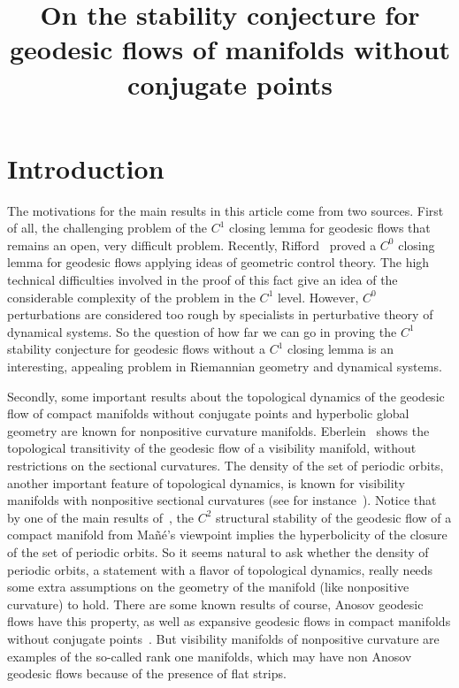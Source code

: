 \documentclass[AHL,Unicode,longabstracts,published]{cedram}
\title[On the stability conjecture for geodesic flows]{On the stability conjecture for geodesic flows of manifolds without conjugate points}
\author[\initial{L.} \lastname{Rifford}]{\firstname{Ludovic} \lastname{Rifford}}
\author[\initial{R.} \lastname{Ruggiero}]{\firstname{Rafael} \lastname{Ruggiero}}
\begin{document}
\maketitle

\section{Introduction}

The motivations for the main results in this article come from two sources. First of all, the challenging problem of the $C^{1}$ closing lemma for geodesic flows that remains an open, very difficult problem. Recently, Rifford~\cite{kn:Rifford} proved a $C^{0}$ closing lemma for geodesic flows applying ideas of geometric control theory. The high technical difficulties involved in the proof of this fact give an idea of the considerable complexity of the problem in the $C^{1}$ level. However, $C^{0}$ perturbations are considered too rough by specialists in perturbative theory of dynamical systems. So the question of how far we can go in proving the $C^{1}$ stability conjecture for geodesic flows without a $C^{1}$ closing lemma is an interesting, appealing problem in Riemannian geometry and dynamical systems.

Secondly, some important results about the topological dynamics of the geodesic flow of compact manifolds without conjugate points and hyperbolic global geometry are known for nonpositive curvature manifolds. Eberlein~\cite{kn:Eberlein} shows the topological transitivity of the geodesic flow of a visibility manifold, without restrictions on the sectional curvatures. The density of the set of periodic orbits, another important feature of topological dynamics, is known for visibility manifolds with nonpositive sectional curvatures (see for instance~\cite{kn:Ballmann}). Notice that by one of the main results of~\cite{kn:ARR}, the $C^{2}$ structural stability of the geodesic flow of a compact manifold from Mañé's viewpoint implies the hyperbolicity of the closure of the set of periodic orbits. So it seems natural to ask whether the density of periodic orbits, a statement with a flavor of topological dynamics, really needs some extra assumptions on the geometry of the manifold (like nonpositive curvature) to hold. There are some known results of course, Anosov geodesic flows have this property, as well as expansive geodesic flows in compact manifolds without conjugate points~\cite{kn:Ruggiero-expansive}. But visibility manifolds of nonpositive curvature are examples of the so-called rank one manifolds, which may have non Anosov geodesic flows because of the presence of flat strips.
\end{document}
